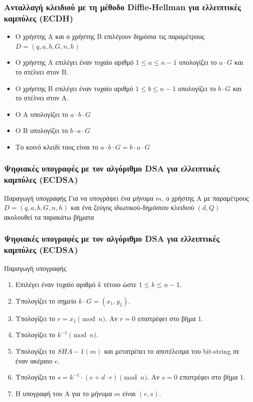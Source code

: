 \documentclass{beamer}
\begin{document}
%
\begin{frame}
\frametitle{Ανταλλαγή κλειδιού με τη μέθοδο Diffie-Hellman για ελλειπτικές καμπύλες (ECDH)}
\begin{itemize}
\item Ο χρήστης Α και ο χρήστης Β επιλέγουν δημόσια τις παραμέτρους $D = (q, a, b, G, n, h)$
\item Ο χρήστης Α επιλέγει έναν τυχαίο αριθμό $1 \leq a \leq n -1$ υπολογίζει το $a \cdot G$ και το στέλνει στον B.
\item Ο χρήστης Β επιλέγει έναν τυχαίο αριθμό $1 \leq b \leq n -1$ υπολογίζει το $b \cdot G$ και το στέλνει στον Α.
\item Ο Α υπολογίζει το $a \cdot b \cdot G$
\item  Ο Β υπολογίζει το $b \cdot a \cdot G$
\item Το κοινό κλειδί τους είναι το $a \cdot b \cdot G = b \cdot a \cdot G$
\end{itemize}
\end{frame}

%
\begin{frame}
\frametitle{Ψηφιακές υπογραφές με τον αλγόριθμο DSA για ελλειπτικές καμπύλες (ECDSA)}
\begin{block}
{Παραγωγή υπογραφής}
Για να υπογράψει ένα μήνυμα $m$, ο χρήστης Α με παραμέτρους $D = (q, a, b, G, n, h)$ και ένα ζεύγος ιδιωτικού-δημόσιου κλειδιού $(d, Q)$ ακολουθεί τα παρακάτω βήματα
\end{block}
\end{frame}

%
\begin{frame}
\frametitle{Ψηφιακές υπογραφές με τον αλγόριθμο DSA για ελλειπτικές καμπύλες (ECDSA)}
\begin{block}
{Παραγωγή υπογραφής}
\begin{small}
\begin{enumerate}
\item Επιλέγει έναν τυχαίο αριθμό $k$ τέτοιο ώστε $1 \leq k \leq n-1$.
\item Υπολογίζει το σημείο $k \cdot G = (x_1, y_1)$.
\item Υπολογίζει το $r = x_1 \pmod n$. Αν $r = 0$ επιστρέφει στο βήμα $1$.
\item Υπολογίζει το $k^{-1} \pmod n$.
\item Υπολογίζει το $SHA-1(m)$ και μετατρέπει το αποτέλεσμα του bit-string σε έναν ακέραιο $e$.
\item Υπολογίζει το $s = k^{-1} \cdot (e + d \cdot r) \pmod n$. Αν $s = 0$ επιστρέφει στο βήμα $1$.
\item Η υπογραφή του A για το μήνυμα $m$ είναι $(r,s)$.
\end{enumerate}
\end{small}
\end{block}
\end{frame}
\end{document}
